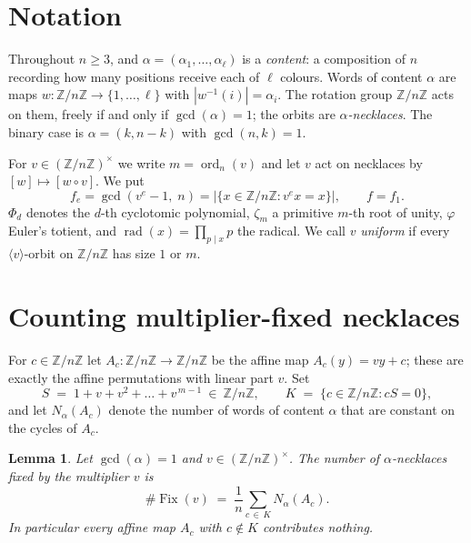 \documentclass[11pt,a4paper]{article}
\theoremstyle{plain}
\newtheorem{lemma}[theorem]{Lemma}
\theoremstyle{definition}
\theoremstyle{remark}
\newcommand{\Z}{\mathbb{Z}}
\newcommand{\Zn}{\Z/n\Z}
\newcommand{\units}[1]{(\Z/#1\Z)^{\times}}
\newcommand{\Fix}{\operatorname{Fix}}
\newcommand{\rad}{\operatorname{rad}}
\newcommand{\ord}{\operatorname{ord}}
\begin{document}
\section{Notation}\label{sec:prelim}

Throughout $n\ge 3$, and $\alpha=(\alpha_1,\dots,\alpha_\ell)$ is a \emph{content}: a
composition of $n$ recording how many positions receive each of $\ell$ colours. Words of
content $\alpha$ are maps $w:\Zn\to\{1,\dots,\ell\}$ with $|w^{-1}(i)|=\alpha_i$. The rotation
group $\Zn$ acts on them, freely if and only if $\gcd(\alpha)=1$; the orbits are
\emph{$\alpha$-necklaces}. The binary case is $\alpha=(k,n-k)$ with $\gcd(n,k)=1$.

For $v\in\units{n}$ we write $m=\ord_n(v)$ and let $v$ act on necklaces by
$[w]\mapsto[w\circ v]$. We put
\[
  f_e=\gcd(v^e-1,\;n)=\bigl|\{x\in\Zn: v^e x=x\}\bigr|,\qquad f=f_1 .
\]
$\Phi_d$ denotes the $d$-th cyclotomic polynomial, $\zeta_m$ a primitive $m$-th root of
unity, $\varphi$ Euler's totient, and $\rad(x)=\prod_{p\mid x}p$ the radical. We call $v$
\emph{uniform} if every $\langle v\rangle$-orbit on $\Zn$ has size $1$ or $m$.

\section{Counting multiplier-fixed necklaces}\label{sec:count}

For $c\in\Zn$ let $A_c:\Zn\to\Zn$ be the affine map $A_c(y)=vy+c$; these are exactly the
affine permutations with linear part $v$. Set
\[
  S \;=\; 1+v+v^2+\dots+v^{\,m-1}\ \in\ \Zn,
  \qquad K \;=\; \{c\in\Zn : cS=0\},
\]
and let $N_\alpha(A_c)$ denote the number of words of content $\alpha$ that are constant on
the cycles of $A_c$.

\begin{lemma}\label{lem:fix}
Let $\gcd(\alpha)=1$ and $v\in\units{n}$. The number of $\alpha$-necklaces fixed by the
multiplier $v$ is
\[
  \#\Fix(v) \;=\; \frac{1}{n}\sum_{c\,\in\,K} N_\alpha(A_c).
\]
In particular every affine map $A_c$ with $c\notin K$ contributes nothing.
\end{lemma}
\end{document}
